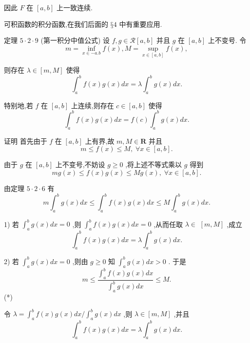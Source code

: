 因此 $F$ 在 $\left\lbrack  {a,b}\right\rbrack$ 上一致连续.

可积函数的积分函数,在我们后面的 $§4$ 中有重要应用.

定理 $5 \cdot  2 \cdot  9$ (第一积分中值公式) 设 $f,g \in  \mathcal{R}\left\lbrack  {a,b}\right\rbrack$ 并且 $g$ 在 $\left\lbrack  {a,b}\right\rbrack$ 上不变号. 令
$$m = \mathop{\inf }\limits_{{x \in   - a.b}}f\left( x\right) ,M = \mathop{\sup }\limits_{{x \in  \left\lbrack  {a,b}\right\rbrack  }}f\left( x\right) ,$$

则存在 $\lambda  \in  \left\lbrack  {m,M}\right\rbrack$ 使得
$${\int }_{a}^{b}f\left( x\right) g\left( x\right) {dx} = \lambda {\int }_{a}^{b}g\left( x\right) {dx}.$$

特别地,若 $f$ 在 $\left\lbrack  {a,b}\right\rbrack$ 上连续,则存在 $c \in  \left\lbrack  {a,b}\right\rbrack$ 使得
$${\int }_{a}^{b}f\left( x\right) g\left( x\right) {dx} = f\left( c\right) {\int }_{a}^{b}g\left( x\right) {dx}.$$

证明 首先由于 $f$ 在 $\left\lbrack  {a,b}\right\rbrack$ 上有界,故 $m,M \in  \mathbf{R}$ 并且
$$m \leq  f\left( x\right)  \leq  M,\;\forall x \in  \left\lbrack  {a,b}\right\rbrack  .$$

由于 $g$ 在 $\left\lbrack  {a,b}\right\rbrack$ 上不变号,不妨设 $g \geq  0$ ,将上述不等式乘以 $g$ 得到
$${mg}\left( x\right)  \leq  f\left( x\right) g\left( x\right)  \leq  {Mg}\left( x\right) ,\;\forall x \in  \left\lbrack  {a,b}\right\rbrack  .$$

由定理 $5 \cdot  2 \cdot  6$ 有
$$m{\int }_{a}^{b}g\left( x\right) {dx} \leq  {\int }_{a}^{b}f\left( x\right) g\left( x\right) {dx} \leq  M{\int }_{a}^{b}g\left( x\right) {dx}.$$

1) 若 ${\int }_{a}^{b}g\left( x\right) {dx} = 0$ ,则 ${\int }_{a}^{b}f\left( x\right) g\left( x\right) {dx} = 0$ ,从而任取 $\lambda  \in$  $\left\lbrack  {m,M}\right\rbrack$ ,成立
$${\int }_{a}^{b}f\left( x\right) g\left( x\right) {dx} = \lambda {\int }_{a}^{b}g\left( x\right) {dx}.$$

2) 若 ${\int }_{a}^{b}g\left( x\right) {dx} = 0$ ,则由 $g \geq  0$ 知 ${\int }_{a}^{b}g\left( x\right) {dx} > 0$ . 于是
$$m \leq  \frac{{\int }_{a}^{b}f\left( x\right) g\left( x\right) {dx}}{{\int }_{a}^{b}g\left( x\right) {dx}} \leq  M.$$
(*)

令 $\lambda  = {\int }_{a}^{b}f\left( x\right) g\left( x\right) {dx}/{\int }_{a}^{b}g\left( x\right) {dx}$ ,则 $\lambda  \in  \left\lbrack  {m,M}\right\rbrack$ ,并且
$${\int }_{a}^{b}f\left( x\right) g\left( x\right) {dx} = \lambda {\int }_{a}^{b}g\left( x\right) {dx}.$$

